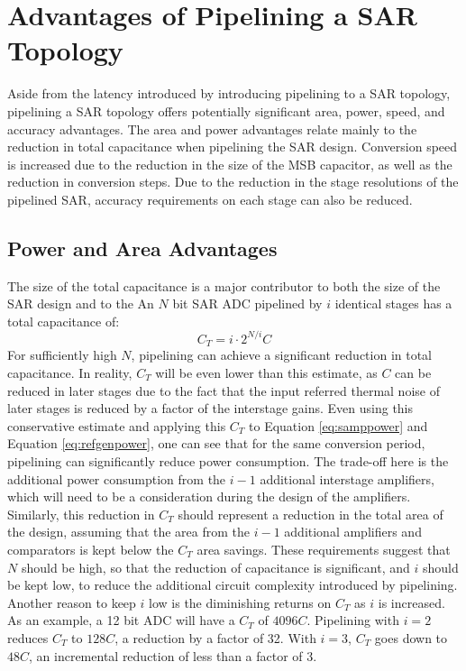 \section{Advantages of Pipelining a SAR Topology}
\label{sec:pipelinesaradv}
Aside from the latency introduced by introducing pipelining to a SAR topology, pipelining a SAR topology offers potentially significant area, power, speed, and accuracy advantages. The area and power advantages relate mainly 
to the reduction in total capacitance when pipelining the SAR design. Conversion speed is increased due to the reduction in the size of the MSB capacitor, as well as the reduction in conversion steps. Due to the reduction in 
the stage resolutions of the pipelined SAR, accuracy requirements on each stage can also be reduced.  
\subsection{Power and Area Advantages}
\label{sec:powerareaadv}
The size of the total capacitance is a major contributor to both the size of the SAR design and to the An $N$ bit SAR ADC pipelined by $i$ identical stages has a total capacitance of: 
\begin{equation}
\label{ctotpipeline}
C_{T} = i\cdot 2^{N/i}C
\end{equation}
For sufficiently high $N$, pipelining can achieve a significant reduction in total capacitance. In reality, $C_T$ will be even lower than this estimate, as $C$ can be reduced in later stages due to the fact that the input referred thermal noise of later stages is reduced by a factor of the interstage gains. Even using this conservative estimate and applying this $C_T$ to Equation \ref{eq:samppower} and Equation \ref{eq:refgenpower}, one can see that for the same conversion period, 
pipelining can significantly reduce power consumption. The trade-off here is the additional power consumption from the $i-1$ additional interstage amplifiers, which will need to be a consideration during the design of the 
amplifiers. Similarly, this reduction in $C_T$ should represent a reduction in the total area of the design, assuming that the area from the $i-1$ additional amplifiers and comparators is kept below the $C_T$ area savings. 
These requirements suggest that $N$ should be high, so that the reduction of capacitance is significant, and $i$ should be kept low, to reduce the additional circuit complexity introduced by pipelining. Another reason to keep $i$
 low is the diminishing returns on $C_T$ as $i$ is increased. As an example, a 12 bit ADC will have a $C_T$ of $4096C$. Pipelining with $i=2$ reduces $C_T$ to $128C$, a reduction by a factor of 32. With $i=3$, $C_T$ goes down 
to $48C$, an incremental reduction of less than a factor of 3.
